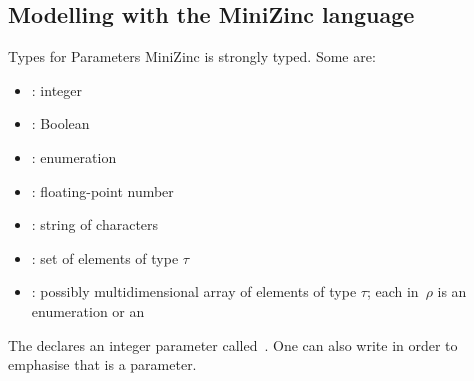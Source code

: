 \documentclass{cons-beamer}
\begin{document}
\begin{flashcardminizinc}
\section{Modelling with the MiniZinc language}

\begin{frame}{Types for Parameters}
  \vspace{-1mm}
  MiniZinc is strongly typed.  Some  are:
  \begin{itemize}
    \item {}: integer
    \item {}: Boolean
    \item {}: enumeration
    \item {}: floating-point number
    \item {}: string of characters
    \item {}: set of elements of type $\tau$
    \item {}: possibly
      multidimensional array of elements of type $\tau$;
      each  in~$\rho$ is an enumeration or an
       
  \end{itemize} \vfill
  \begin{example}
    The   declares an
    integer parameter called~.  One can also write
     in order to emphasise that  is
    a parameter.
  \end{example}
\end{frame}


\end{flashcardminizinc}
\end{document}
